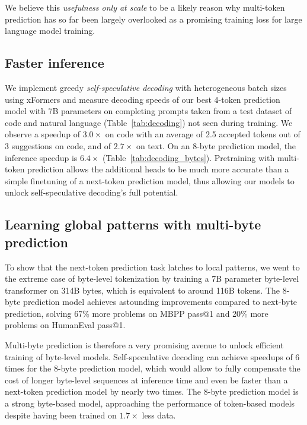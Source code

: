 We believe this \emph{usefulness only at scale} to be a likely reason why multi-token prediction has so far been largely overlooked as a promising training loss for large language model training. 

\subsection{Faster inference}
\label{sect:decoding}

We implement greedy \emph{self-speculative decoding} \cite{stern2018blockwise} with heterogeneous batch sizes using xFormers \citep{xFormers2022} and measure decoding speeds of our best 4-token prediction model with 7B parameters on completing prompts taken from a test dataset of code and natural language (Table~\ref{tab:decoding}) not seen during training. We observe a speedup of $\mathbf{3.0\times}$ on code with an average of 2.5 accepted tokens out of 3 suggestions on code, and of $2.7\times$ on text. On an 8-byte prediction model, the inference speedup is $6.4\times$ (Table~\ref{tab:decoding_bytes}). Pretraining with multi-token prediction allows the additional heads to be much more accurate than a simple finetuning of a next-token prediction model, thus allowing our models to unlock self-speculative decoding's full potential. %

\subsection{Learning global patterns with multi-byte prediction}
\label{sect:byte-level}
To show that the next-token prediction task latches to local patterns, we went to the extreme case of byte-level tokenization by training a 7B parameter byte-level transformer  on 314B bytes, which is equivalent to around 116B tokens. The 8-byte prediction model achieves astounding improvements compared to next-byte prediction, solving 67\% more problems on MBPP pass@1 and 20\% more problems on HumanEval pass@1. 

Multi-byte prediction is therefore a very promising avenue to unlock efficient training of byte-level models. Self-speculative decoding can achieve speedups of 6 times for the 8-byte prediction model, which would allow to fully compensate the cost of longer byte-level sequences at inference time and even be faster than a next-token prediction model by nearly two times. The 8-byte prediction model is a strong byte-based model, approaching the performance of token-based models despite having been trained on $1.7\times$ less data.

